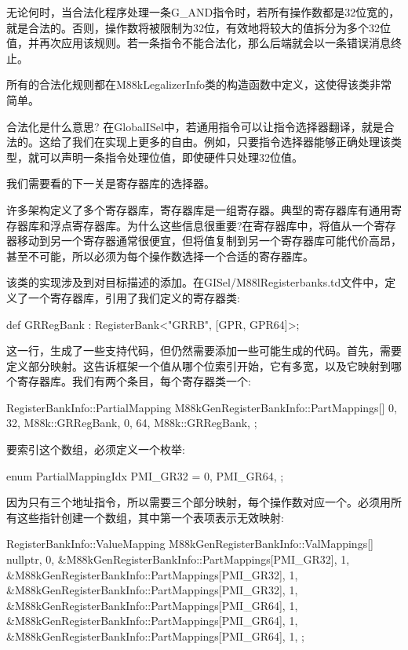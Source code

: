 无论何时，当合法化程序处理一条G\_AND指令时，若所有操作数都是32位宽的，就是合法的。否则，操作数将被限制为32位，有效地将较大的值拆分为多个32位值，并再次应用该规则。若一条指令不能合法化，那么后端就会以一条错误消息终止。

所有的合法化规则都在M88kLegalizerInfo类的构造函数中定义，这使得该类非常简单。

\begin{myTip}{合法化是什么意思?}
在GlobalISel中，若通用指令可以让指令选择器翻译，就是合法的。这给了我们在实现上更多的自由。例如，只要指令选择器能够正确处理该类型，就可以声明一条指令处理位值，即使硬件只处理32位值。
\end{myTip}

我们需要看的下一关是寄存器库的选择器。


许多架构定义了多个寄存器库，寄存器库是一组寄存器。典型的寄存器库有通用寄存器库和浮点寄存器库。为什么这些信息很重要?在寄存器库中，将值从一个寄存器移动到另一个寄存器通常很便宜，但将值复制到另一个寄存器库可能代价高昂，甚至不可能，所以必须为每个操作数选择一个合适的寄存器库。

该类的实现涉及到对目标描述的添加。在GISel/M88lRegisterbanks.td文件中，定义了一个寄存器库，引用了我们定义的寄存器类:

\begin{cpp}
def GRRegBank : RegisterBank<"GRRB", [GPR, GPR64]>;
\end{cpp}

这一行，生成了一些支持代码，但仍然需要添加一些可能生成的代码。首先，需要定义部分映射。这告诉框架一个值从哪个位索引开始，它有多宽，以及它映射到哪个寄存器库。我们有两个条目，每个寄存器类一个:

\begin{cpp}
RegisterBankInfo::PartialMapping
    M88kGenRegisterBankInfo::PartMappings[]{
        {0, 32, M88k::GRRegBank},
        {0, 64, M88k::GRRegBank},
    };
\end{cpp}

要索引这个数组，必须定义一个枚举:

\begin{cpp}
enum PartialMappingIdx { PMI_GR32 = 0, PMI_GR64, };
\end{cpp}

因为只有三个地址指令，所以需要三个部分映射，每个操作数对应一个。必须用所有这些指针创建一个数组，其中第一个表项表示无效映射:

\begin{cpp}
RegisterBankInfo::ValueMapping
    M88kGenRegisterBankInfo::ValMappings[]{
        {nullptr, 0},
        {&M88kGenRegisterBankInfo::PartMappings[PMI_GR32], 1},
        {&M88kGenRegisterBankInfo::PartMappings[PMI_GR32], 1},
        {&M88kGenRegisterBankInfo::PartMappings[PMI_GR32], 1},
        {&M88kGenRegisterBankInfo::PartMappings[PMI_GR64], 1},
        {&M88kGenRegisterBankInfo::PartMappings[PMI_GR64], 1},
        {&M88kGenRegisterBankInfo::PartMappings[PMI_GR64], 1},
    };
\end{cpp}

